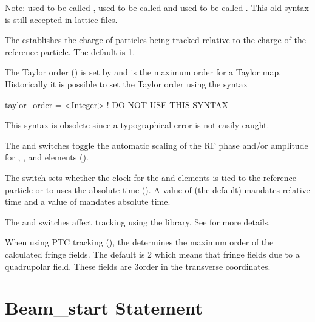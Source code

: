 Note:  used to be called , 
used to be called  and  used to be
called . This old syntax is still accepted in
lattice files.

The  establishes the charge of particles being
tracked relative to the charge of the reference particle. The default
is 1. 

The Taylor order () is set by
 and is the maximum order for a Taylor map.
Historically it is possible to set the Taylor order using the syntax
\begin{example}
  taylor_order = <Integer>   ! DO NOT USE THIS SYNTAX
\end{example}
This syntax is obsolete since a typographical error is not easily caught.

The  and  switches
toggle the automatic scaling of the RF phase and/or amplitude for
, , and  elements ().

The  switch sets whether the clock for the
 and  elements is tied to the reference
particle or to uses the absolute time (). A value of
 (the default) mandates relative time and a value of
 mandates absolute time.

The  and  switches affect
tracking using the  library. See  for more
details.

When using PTC tracking (), the
 determines the maximum order of
the calculated fringe fields. The default is 2 which means that fringe
fields due to a quadrupolar field. These fields are 3\Rd order in the
transverse coordinates.

\section{Beam_start Statement} \label{s:beam.start}

